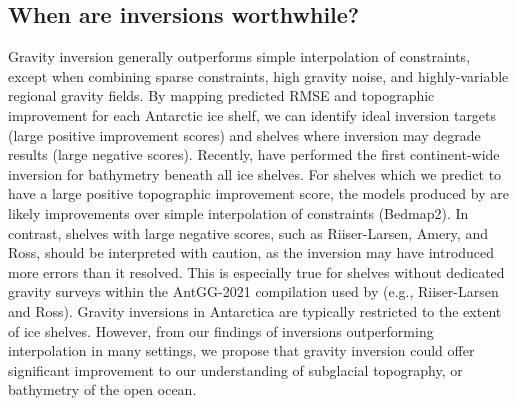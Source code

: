 \documentclass[tc, manuscript]{copernicus}
\begin{document}
\subsection{When are inversions worthwhile?}
Gravity inversion generally outperforms simple interpolation of constraints, except when combining sparse constraints, high gravity noise, and highly-variable regional gravity fields. By mapping predicted RMSE and topographic improvement for each Antarctic ice shelf, we can identify ideal inversion targets (large positive improvement scores) and shelves where inversion may degrade results (large negative scores). Recently, \citep{charrassinbathymetry2025} have performed the first continent-wide inversion for bathymetry beneath all ice shelves. For shelves which we predict to have a large positive topographic improvement score, the models produced by \citet{charrassinbathymetry2025} are likely improvements over simple interpolation of constraints (Bedmap2). In contrast, shelves with large negative scores, such as Riiser-Larsen, Amery, and Ross, should be interpreted with caution, as the inversion may have introduced more errors than it resolved. This is especially true for shelves without dedicated gravity surveys within the AntGG-2021 compilation used by \citep{charrassinbathymetry2025} (e.g., Riiser-Larsen and Ross). Gravity inversions in Antarctica are typically restricted to the extent of ice shelves. However, from our findings of inversions outperforming interpolation in many settings, we propose that gravity inversion could offer significant improvement to our understanding of subglacial topography, or bathymetry of the open ocean.
\end{document}
